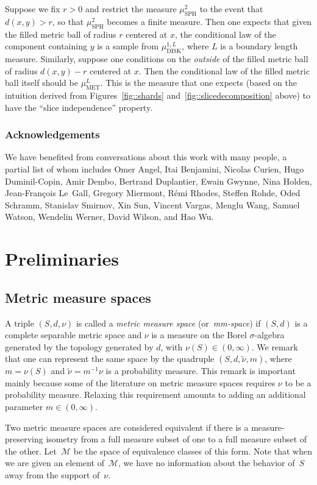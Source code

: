 \documentclass[10pt]{amsart}
\let\mathcal\mathscr
\theoremstyle{plain}
\numberwithin{theorem}{section}
\theoremstyle{definition}
\newcommand\mmspace{{\mathcal M}}
\newcommand{\mustwo}{\mu_{\mathrm{SPH}}^2}
\newcommand{\mudonel}{\mu_{ \mathrm{DISK}}^{1, L}}
\newcommand{\muml}{\mu_{\mathrm{MET}}^L}
\let\wt\widetilde
\begin{document}
Suppose we fix $r >0$ and restrict the measure $\mustwo$ to the event that $d(x,y) > r$, so that $\mustwo$ becomes a finite measure. Then one expects that given the filled metric ball of radius $r$ centered at $x$, the conditional law of the component containing $y$ is a sample from $\mudonel$, where $L$ is a boundary length measure. Similarly, suppose one conditions on the \emph{outside} of the filled metric ball of radius $d(x,y) - r$ centered at $x$. Then the conditional law of the filled metric ball itself should be $\muml$. This is the measure that one expects (based on the intuition derived from Figures~\ref{fig::shards} and~\ref{fig::slicedecomposition} above) to have the ``slice independence'' property.

\subsubsection*{Acknowledgements}
We have benefited from conversations about this work with many people, a partial list of whom includes Omer Angel, Itai Benjamini, Nicolas Curien, Hugo Duminil-Copin, Amir Dembo, Bertrand Duplantier, Ewain Gwynne, Nina Holden, Jean-François Le~Gall, Gregory Miermont, Rémi Rhodes, Steffen Rohde, Oded Schramm, Stanislav Smirnov, Xin Sun, Vincent Vargas, Menglu Wang, Samuel Watson, Wendelin Werner, David Wilson, and Hao Wu.

\section{Preliminaries}
\label{sec::preliminaries}

\subsection{Metric measure spaces}

A triple $(S, d, \nu)$ is called a \emph{metric measure space} (or~\emph{mm-space}) if $(S,d)$ is a complete separable metric space and $\nu$ is a measure on the Borel $\sigma$-algebra generated by the topology generated by $d$, with $\nu(S) \in (0, \infty)$. We remark that one can represent the same space by the quadruple $(S, d, \wt \nu, m)$, where $m = \nu(S)$ and $\wt \nu = m^{-1} \nu$ is a probability measure. This remark is important mainly because some of the literature on metric measure spaces requires $\nu$ to be a probability measure. Relaxing this requirement amounts to adding an additional parameter $m \in (0, \infty)$.

Two metric measure spaces are considered equivalent if there is a measure-preserving isometry from a full measure subset of one to a full measure subset of the other. Let~$\mmspace$ be the space of equivalence classes of this form. Note that when we are given an element of~$\mmspace$, we have no information about the behavior of~$S$ away from the support of~$\nu$.
\end{document}
